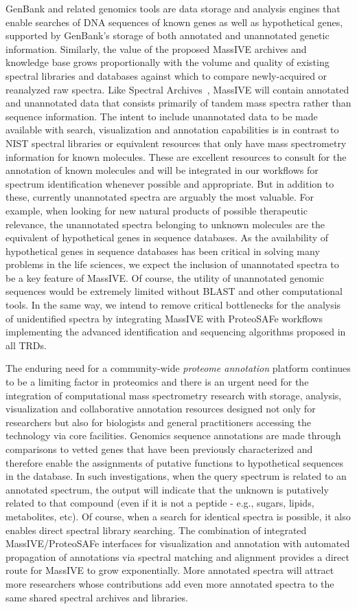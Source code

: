 \documentclass[arial,11pt]{article}
\begin{document}
GenBank and related genomics tools are data storage and analysis engines that enable searches of DNA sequences of known genes as well as hypothetical genes, supported by GenBank's storage of both annotated and unannotated genetic information. Similarly, the value of the proposed MassIVE archives and knowledge base grows proportionally with the volume and quality of existing spectral libraries and databases against which to compare newly-acquired or reanalyzed raw spectra. Like Spectral Archives~\cite{frank11}, MassIVE will contain annotated and unannotated data that consists primarily of tandem mass spectra rather than sequence information. The intent to include unannotated data to be made available with search, visualization and annotation capabilities is in contrast to NIST spectral libraries or equivalent resources that only have mass spectrometry information for known molecules. These are excellent resources to consult for the annotation of known molecules and will be integrated in our workflows for spectrum identification whenever possible and appropriate. But in addition to these, currently unannotated spectra are arguably the most valuable. For example, when looking for new natural products of possible therapeutic relevance, the unannotated spectra belonging to unknown molecules are the equivalent of hypothetical genes in sequence databases. As the availability of hypothetical genes in sequence databases has been critical in solving many problems in the life sciences, we expect the inclusion of unannotated spectra to be a key feature of MassIVE. Of course, the utility of unannotated genomic sequences would be extremely limited without BLAST and other computational tools. In the same way, we intend to remove critical bottlenecks for the analysis of unidentified spectra by integrating MassIVE with ProteoSAFe workflows implementing the advanced identification and sequencing algorithms proposed in all TRDs.

The enduring need for a community-wide {\em proteome annotation} platform continues to be a limiting factor in proteomics and there is an urgent need for the integration of computational mass spectrometry research with storage, analysis, visualization and collaborative annotation resources designed not only for researchers but also for biologists and general practitioners accessing the technology via core facilities. Genomics sequence annotations are made through comparisons to vetted genes that have been previously characterized and therefore enable the assignments of putative functions to hypothetical sequences in the database. In such investigations, when the query spectrum is related to an annotated spectrum, the output will indicate that the unknown is putatively related to that compound (even if it is not a peptide - e.g., sugars, lipids, metabolites, etc). Of course, when a search for identical spectra is possible, it also enables direct spectral library searching. The combination of integrated MassIVE/ProteoSAFe interfaces for visualization and annotation with automated propagation of annotations via spectral matching and alignment provides a direct route for MassIVE to grow exponentially. More annotated spectra will attract more researchers whose contributions add even more annotated spectra to the same shared spectral archives and libraries.
\end{document}
